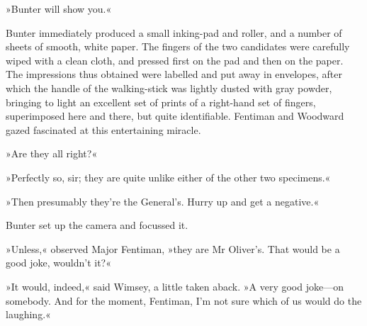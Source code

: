 »Bunter will show you.«

Bunter immediately produced a small inking-pad and roller, and a number of sheets of smooth, white paper. The fingers of the two candidates were carefully wiped with a clean cloth, and pressed first on the pad and then on the paper. The impressions thus obtained were labelled and put away in envelopes, after which the handle of the walking-stick was lightly dusted with gray powder, bringing to light an excellent set of prints of a right-hand set of fingers, superimposed here and there, but quite identifiable. Fentiman and Woodward gazed fascinated at this entertaining miracle.

»Are they all right?«

»Perfectly so, sir; they are quite unlike either of the other two specimens.«

»Then presumably they're the General's. Hurry up and get a negative.«

Bunter set up the camera and focussed it.

»Unless,« observed Major Fentiman, »they are Mr Oliver's. That would be a good joke, wouldn't it?«

»It would, indeed,« said Wimsey, a little taken aback. »A very good joke—on somebody. And for the moment, Fentiman, I'm not sure which of us would do the laughing.«

